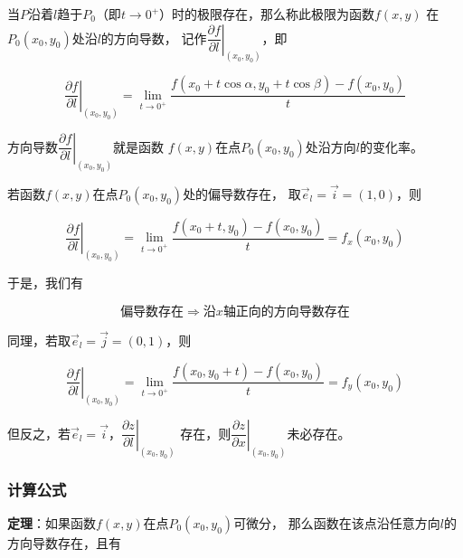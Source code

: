 \documentclass[12pt, a4paper]{article}
\numberwithin{equation}{section}
\begin{document}
    当\(P\)沿着\(l\)趋于\(P_0\)（即\(t \rightarrow 0^{+}\)）时的极限存在，那么称此极限为函数\(f\left(x,y\right)\)
    在\\\(P_0\left(x_0,y_0\right)\)处沿\(l\)的方向导数，
    记作\(\left.\dfrac{\partial f}{\partial l}\right|_{\left(x_0,y_0\right)}\)，即

    \begin{equation}
        \left.\frac{\partial f}{\partial l}\right|_{\left(x_0, y_0\right)}=
        \lim_{t \rightarrow 0^{+}} \frac{f\left(x_0+t \cos \alpha, y_0+t \cos \beta\right)-f\left(x_0, y_0\right)}{t}
    \end{equation}

    方向导数\(\left.\dfrac{\partial f}{\partial l}\right|_{\left(x_0,y_0\right)}\)就是函数
    \(f\left(x,y\right)\)在点\(P_0\left(x_0,y_0\right)\)处沿方向\(l\)的变化率。
    
    若函数\(f\left(x,y\right)\)在点\(P_0\left(x_0,y_0\right)\)处的偏导数存在，
    取\(\overrightarrow{e}_l = \overrightarrow{i} = (1,0)\)，则

    \begin{equation*}
        \left.\frac{\partial f}{\partial l}\right|_{\left(x_0, y_0\right)}=
        \lim _{t \rightarrow 0^{+}} \frac{f\left(x_0+t, y_0\right)-f\left(x_0, y_0\right)}{t}=f_x\left(x_0, y_0\right)
    \end{equation*}

    于是，我们有

    $$
        \text{偏导数存在} \Rightarrow \text{沿\(x\)轴正向的方向导数存在}
    $$

    同理，若取\(\overrightarrow{e}_l = \overrightarrow{j} = (0,1)\)，则

    \begin{equation*}
        \left.\frac{\partial f}{\partial l}\right|_{\left(x_0, y_0\right)}=
        \lim _{t \rightarrow 0^{+}} \frac{f\left(x_0, y_0+t\right)-f\left(x_0, y_0\right)}{t}=f_y\left(x_0, y_0\right)
    \end{equation*}

    但反之，若\(\overrightarrow{e}_l = \overrightarrow{i}\)，\(\left.\dfrac{\partial z}{\partial l}\right|_{\left(x_0,y_0\right)}\)
    存在，则\(\left.\dfrac{\partial z}{\partial x}\right|_{\left(x_0,y_0\right)}\)未必存在。

\subsubsection{计算公式}

    \textbf{定理}：如果函数\(f\left(x,y\right)\)在点\(P_0\left(x_0,y_0\right)\)可微分，
    那么函数在该点沿任意方向\(l\)的方向导数存在，且有
\end{document}

